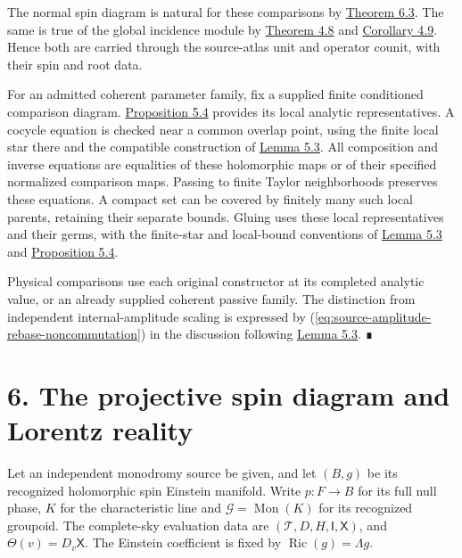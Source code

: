 \documentclass[
  english,
  11pt,
  reqno]{amsart}
\begin{document}
The normal spin diagram is natural for these comparisons by
\hyperref[thm:global-projective-diagram-naturality]{Theorem 6.3}. The
same is true of the global incidence module by
\hyperref[thm:global-parametrized-point-module-family]{Theorem 4.8} and
\hyperref[cor:operator-incidence-enrichment-v08]{Corollary 4.9}. Hence
both are carried through the source-atlas unit and operator counit, with
their spin and root data.

For an admitted coherent parameter family, fix a supplied finite
conditioned comparison diagram.
\hyperref[prop:source-atlas-local-analytic-execution]{Proposition 5.4}
provides its local analytic representatives. A cocycle equation is
checked near a common overlap point, using the finite local star there
and the compatible construction of
\hyperref[lem:compatible-source-amplitude-diagrams]{Lemma 5.3}. All
composition and inverse equations are equalities of these holomorphic
maps or of their specified normalized comparison maps. Passing to finite
Taylor neighborhoods preserves these equations. A compact set can be
covered by finitely many such local parents, retaining their separate
bounds. Gluing uses these local representatives and their germs, with
the finite-star and local-bound conventions of
\hyperref[lem:compatible-source-amplitude-diagrams]{Lemma 5.3} and
\hyperref[prop:source-atlas-local-analytic-execution]{Proposition 5.4}.

Physical comparisons use each original constructor at its completed
analytic value, or an already supplied coherent passive family. The
distinction from independent internal-amplitude scaling is expressed by
(\ref{eq:source-amplitude-rebase-noncommutation}) in the discussion
following \hyperref[lem:compatible-source-amplitude-diagrams]{Lemma
5.3}. ∎

\protect{}\label{sec:spin-reality-v08}

\section{6. The projective spin diagram and Lorentz
reality}\label{the-projective-spin-diagram-and-lorentz-reality}

Let an independent monodromy source be given, and let \((B,g)\) be its
recognized holomorphic spin Einstein manifold. Write \(p:F\to B\) for
its full null phase, \(K\) for the characteristic line and
\(\mathcal G=\operatorname{Mon}(K)\) for its recognized groupoid. The
complete-sky evaluation data are
\((\mathcal T,D,H,\mathsf I,\mathsf X)\), and
\(\Theta(v)=D_v\mathsf X\). The Einstein coefficient is fixed by
\(\operatorname{Ric}(g)=\Lambda g\).
\end{document}
